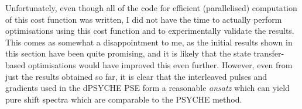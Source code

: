 Unfortunately, even though all of the code for efficient (parallelised) computation of this cost function was written, I did not have the time to actually perform optimisations using this cost function and to experimentally validate the results.
This comes as somewhat a disappointment to me, as the initial results shown in this section have been quite promising, and it is likely that the state transfer-based optimisations would have improved this even further.
However, even from just the results obtained so far, it is clear that the interleaved pulses and gradients used in the dPSYCHE PSE form a reasonable \textit{ansatz} which can yield pure shift spectra which are comparable to the PSYCHE method.
